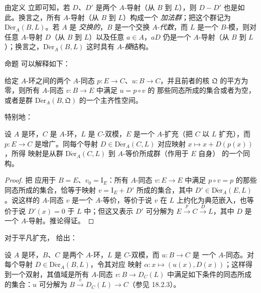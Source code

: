 由定义  立即可知，若 $D$、$D'$ 是两个 $A$-导射（从 $B$
到 $L$），则 $D-D'$ 也是如此。换言之，所有 $A$-导射（从 $B$ 到 $L$）构成一个
\emph{加法群}；把这个群记为 $\operatorname{D\acute{e}r}_A(B,L)$。若 $A$ 是
\emph{交换的}，$B$ 是一个交换 $A$-\emph{代数}，而 $L$ 是一个 $B$-模，则对
任意 $A$-导射 $D$（从 $B$ 到 $L$）以及任意 $a\in A$，$aD$ 仍是一个
$A$-导射（从 $B$ 到 $L$）；换言之，$\operatorname{D\acute{e}r}_A(B,L)$ 这时具有
$A$-\emph{模}结构。

命题  可以解释如下：

\begin{corollary}[20.1.3]
\label{0.20.1.3-fr}
给定 $A$-环之间的两个 $A$-同态 $p:E\to C$、$u:B\to C$，并且前者的核
$\mathfrak{Q}$ 的平方为零，则所有 $A$-同态 $v:B\to E$ 中满足 $u=p\circ v$ 的
那些同态所成的集合或者为空，或者是群 $\operatorname{D\acute{e}r}_A(B,\mathfrak{Q})$
的一个主齐性空间。
\end{corollary}

特别地：

\begin{corollary}[20.1.4]
\label{0.20.1.4-fr}
设 $A$ 是环，$C$ 是 $A$-环，$L$ 是 $C$-双模，$E$ 是一个 $A$-扩充（把
$C$ 以 $L$ 扩充），而 $p:E\to C$ 是增广。同每个导射
$D\in\operatorname{D\acute{e}r}_A(C,L)$ 对应映射 $x\mapsto x+D(p(x))$，所得
映射是从群 $\operatorname{D\acute{e}r}_A(C,L)$ 到 $A$-等价所成群（作用于
$E$ 自身）
的一个同构。
\end{corollary}

\begin{proof}
把  应用于 $B=E$、$v_0=\mathrm{I}_E$：所有
$A$-同态 $v:E\to E$ 中满足 $p\circ v=p$ 的那些同态所成的集合，恰等于映射
$v=\mathrm{I}_E+D'$ 所成的集合，其中
$D'\in\operatorname{D\acute{e}r}_A(E,L)$。说这样的 $A$-同态 $v$ 是一个
$A$-等价，等价于说 $v$ 在 $L$ 上约化为典范嵌入，也等价于说
$D'(x)=0$ 于 $L$ 中；但这又表示 $D'$ 可分解为
$E\xrightarrow{p}C\xrightarrow{D}L$，其中 $D$ 是一个 $A$-导射。推论得证。
\end{proof}

对于平凡扩充， 给出：

\begin{corollary}[20.1.5]
\label{0.20.1.5-fr}
设 $A$ 是环，$B$、$C$ 是两个 $A$-环，$L$ 是 $C$-双模，而 $u:B\to C$ 是
一个 $A$-同态。对每个导射 $D\in\operatorname{D\acute{e}r}_A(B,L)$，令其对应
映射 $\alpha:x\mapsto(u(x),D(x))$；这样得到一个双射，其值域是所有
$A$-同态 $v:B\to D_C(L)$ 中满足如下条件的同态所成的集合：$u$ 可分解为
$B\xrightarrow{v}D_C(L)\to C$（参见 18.2.3）。
\end{corollary}

